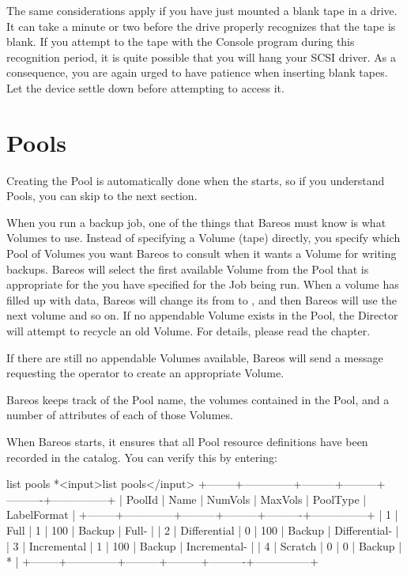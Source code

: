 The same considerations apply if you have just mounted a blank tape in a drive.
It can take a minute or two before the drive properly
recognizes that the tape is blank.
If you attempt to  the tape with
the Console program during this recognition period, it is quite possible that
you will hang your SCSI driver.
As a
consequence, you are again urged to have patience when inserting blank tapes.
Let the device settle down before attempting to access it.



\section{Pools}
\label{Pool}

Creating the Pool is automatically done when the \bareosDir starts, so if you
understand Pools, you can skip to the next section.

When you run a backup job, one of the things that Bareos must know is what Volumes to
use. Instead of specifying a Volume (tape) directly, you
specify which Pool of Volumes you want Bareos to consult when it wants a Volume
for writing backups. Bareos will select the first available Volume from the
Pool that is appropriate for the  you have specified for the Job
being run. When a volume has filled up with data, Bareos will change its
 from  to , and then Bareos will use the
next volume and so on. If no appendable Volume exists in the Pool, the
Director will attempt to recycle an old Volume.
For details, please read the  chapter.

If there are still no
appendable Volumes available, Bareos will send a message requesting the
operator to create an appropriate Volume.

Bareos keeps track of the Pool name, the volumes contained in the Pool,
and a number of attributes of each of those Volumes.

When Bareos starts, it ensures that all Pool resource definitions have been
recorded in the catalog. You can verify this by entering:
\begin{bconsole}{list pools}
*<input>list pools</input>
+--------+--------------+---------+---------+----------+---------------+
| PoolId | Name         | NumVols | MaxVols | PoolType | LabelFormat   |
+--------+--------------+---------+---------+----------+---------------+
| 1      | Full         | 1       | 100     | Backup   | Full-         |
| 2      | Differential | 0       | 100     | Backup   | Differential- |
| 3      | Incremental  | 1       | 100     | Backup   | Incremental-  |
| 4      | Scratch      | 0       | 0       | Backup   | *             |
+--------+--------------+---------+---------+----------+---------------+
\end{bconsole}


